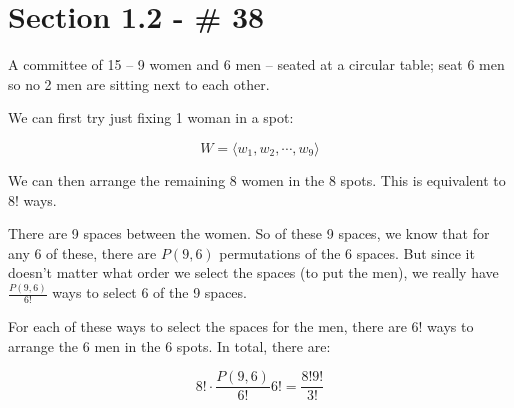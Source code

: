 \documentclass{article}
\begin{document}
\section*{Section 1.2 - \# 38}

A committee of 15 -- 9 women and 6 men -- seated at a circular table;
seat 6 men so no 2 men are sitting next to each other.

We can first try just fixing 1 woman in a spot:

\[
W=\langle w_1,w_2,\cdots,w_9\rangle
\]

We can then arrange the remaining 8 women in the 8 spots. This is
equivalent to $8!$ ways.

There are 9 spaces between the women. So of these 9 spaces, we know
that for any 6 of these, there are $P(9,6)$ permutations of the 6
spaces. But since it doesn't matter what order we select the spaces
(to put the men), we really have $\frac{P(9,6)}{6!}$ ways to select 6
of the 9 spaces.

For each of these ways to select the spaces for the men, there are
$6!$ ways to arrange the 6 men in the 6 spots. In total, there are:

\[
8!\cdot\frac{P(9,6)}{6!}6!=\frac{8!9!}{3!}
\]
\end{document}
